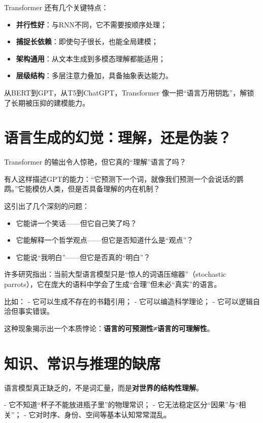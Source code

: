 Transformer 还有几个关键特点：

\begin{itemize}
\item \textbf{并行性好}：与RNN不同，它不需要按顺序处理；
\item \textbf{捕捉长依赖}：即使句子很长，也能全局建模；
\item \textbf{架构通用}：从文本生成到多模态理解都能适用；
\item \textbf{层级结构}：多层注意力叠加，具备抽象表达能力。
\end{itemize}

从BERT到GPT，从T5到ChatGPT，Transformer 像一把“语言万用钥匙”，解锁了长期被压抑的建模能力。

\section*{语言生成的幻觉：理解，还是伪装？}

Transformer 的输出令人惊艳，但它真的“理解”语言了吗？

有人这样描述GPT的能力：“它预测下一个词，就像我们预测一个会说话的鹦鹉。”它能模仿人类，但是否具备理解的内在机制？

这引出了几个深刻的问题：

\begin{itemize}
\item 它能讲一个笑话——但它自己笑了吗？
\item 它能解释一个哲学观点——但它是否知道什么是“观点”？
\item 它能说“我明白”——但它是否真的“明白”？
\end{itemize}

许多研究指出：当前大型语言模型只是“惊人的词语压缩器”（stochastic parrots），它在庞大的语料中学会了生成“合理”但未必“真实”的语言。

比如：
- 它可以生成不存在的书籍引用；
- 它可以编造科学理论；
- 它可以逻辑自洽但事实错误。

这种现象揭示出一个本质悖论：\textbf{语言的可预测性≠语言的可理解性}。

\section*{知识、常识与推理的缺席}

语言模型真正缺乏的，不是词汇量，而是\textbf{对世界的结构性理解}。

- 它不知道“杯子不能放进瓶子里”的物理常识；
- 它无法稳定区分“因果”与“相关”；
- 它对时序、身份、空间等基本认知常常混乱。

